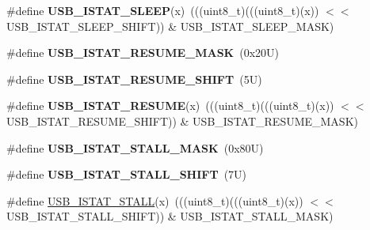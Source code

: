 \begin{DoxyCompactItemize}
\item 
\mbox{\label{group___u_s_b___register___masks_gaf85aae24718a5e6e24e6ac081f03ea89}} 
\#define {\bfseries U\+S\+B\+\_\+\+I\+S\+T\+A\+T\+\_\+\+S\+L\+E\+EP}(x)~(((uint8\+\_\+t)(((uint8\+\_\+t)(x)) $<$$<$ U\+S\+B\+\_\+\+I\+S\+T\+A\+T\+\_\+\+S\+L\+E\+E\+P\+\_\+\+S\+H\+I\+FT)) \& U\+S\+B\+\_\+\+I\+S\+T\+A\+T\+\_\+\+S\+L\+E\+E\+P\+\_\+\+M\+A\+SK)
\item 
\mbox{\label{group___u_s_b___register___masks_ga072350db0370ccd930e192c850ef52d9}} 
\#define {\bfseries U\+S\+B\+\_\+\+I\+S\+T\+A\+T\+\_\+\+R\+E\+S\+U\+M\+E\+\_\+\+M\+A\+SK}~(0x20\+U)
\item 
\mbox{\label{group___u_s_b___register___masks_gadf654883244211ef077839ab67084069}} 
\#define {\bfseries U\+S\+B\+\_\+\+I\+S\+T\+A\+T\+\_\+\+R\+E\+S\+U\+M\+E\+\_\+\+S\+H\+I\+FT}~(5\+U)
\item 
\mbox{\label{group___u_s_b___register___masks_gab6efd0d1a586db5df6ed26ed748e5bce}} 
\#define {\bfseries U\+S\+B\+\_\+\+I\+S\+T\+A\+T\+\_\+\+R\+E\+S\+U\+ME}(x)~(((uint8\+\_\+t)(((uint8\+\_\+t)(x)) $<$$<$ U\+S\+B\+\_\+\+I\+S\+T\+A\+T\+\_\+\+R\+E\+S\+U\+M\+E\+\_\+\+S\+H\+I\+FT)) \& U\+S\+B\+\_\+\+I\+S\+T\+A\+T\+\_\+\+R\+E\+S\+U\+M\+E\+\_\+\+M\+A\+SK)
\item 
\mbox{\label{group___u_s_b___register___masks_gaab3ce766c4d9a80eaddf42589789ab2d}} 
\#define {\bfseries U\+S\+B\+\_\+\+I\+S\+T\+A\+T\+\_\+\+S\+T\+A\+L\+L\+\_\+\+M\+A\+SK}~(0x80\+U)
\item 
\mbox{\label{group___u_s_b___register___masks_ga02df98ee1c82991ef063f89d4ef6ce2b}} 
\#define {\bfseries U\+S\+B\+\_\+\+I\+S\+T\+A\+T\+\_\+\+S\+T\+A\+L\+L\+\_\+\+S\+H\+I\+FT}~(7\+U)
\item 
\#define \mbox{\hyperlink{group___u_s_b___register___masks_gafd22a3ab3195553330b51721fa0ffbf3}{U\+S\+B\+\_\+\+I\+S\+T\+A\+T\+\_\+\+S\+T\+A\+LL}}(x)~(((uint8\+\_\+t)(((uint8\+\_\+t)(x)) $<$$<$ U\+S\+B\+\_\+\+I\+S\+T\+A\+T\+\_\+\+S\+T\+A\+L\+L\+\_\+\+S\+H\+I\+FT)) \& U\+S\+B\+\_\+\+I\+S\+T\+A\+T\+\_\+\+S\+T\+A\+L\+L\+\_\+\+M\+A\+SK)
\end{DoxyCompactItemize}
